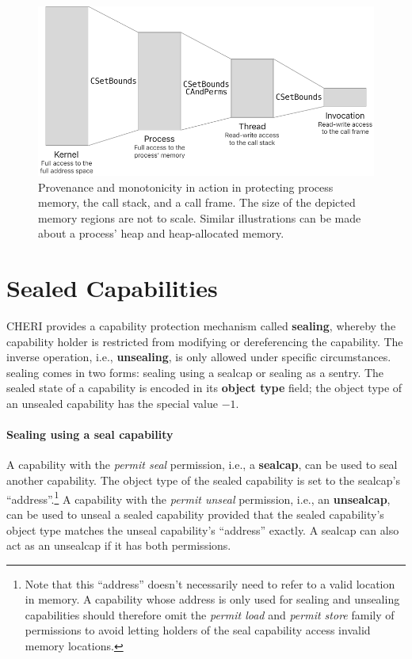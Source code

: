 \documentclass[main.tex]{subfiles}
\begin{document}
\begin{figure}
	\begin{center}
		\includegraphics{Images/Deriving Authority.pdf}
	\end{center}
	\caption{Provenance and monotonicity in action in protecting process memory, the call stack, and a call frame. The size of the depicted memory regions are not to scale. Similar illustrations can be made about a process' heap and heap-allocated memory.}
	\label{fig:derivingauth}
\end{figure}

\section{Sealed Capabilities}
CHERI provides a capability protection mechanism called \textbf{\gls{sealing}}, whereby the capability holder is restricted from modifying or dereferencing the capability. The inverse operation, i.e., \textbf{\gls{unsealing}}, is only allowed under specific circumstances. \Gls{sealing} comes in two forms: \gls{sealing} using a \gls{sealcap} or \gls{sealing} as a \gls{sentry}. The sealed state of a capability is encoded in its \textbf{object type} field; the object type of an unsealed capability has the special value $-1$.

\paragraph{Sealing using a seal capability} A capability with the \emph{permit seal} permission, i.e., a \textbf{\gls{sealcap}}, can be used to seal another capability. The object type of the sealed capability is set to the \gls{sealcap}'s \enquote{address}.\footnote{Note that this \enquote{address} doesn't necessarily need to refer to a valid location in memory. A capability whose address is only used for sealing and unsealing capabilities should therefore omit the \emph{permit load} and \emph{permit store} family of permissions to avoid letting holders of the seal capability access invalid memory locations.} A capability with the \emph{permit unseal} permission, i.e., an \textbf{\gls{unsealcap}}, can be used to unseal a sealed capability provided that the sealed capability's object type matches the unseal capability's \enquote{address} exactly. A \gls{sealcap} can also act as an \gls{unsealcap} if it has both permissions.
\end{document}
